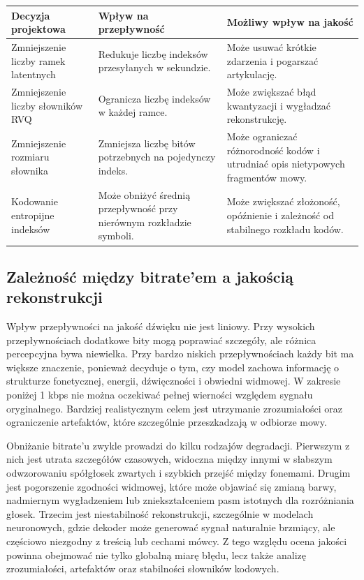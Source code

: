 \begin{center}
\footnotesize
\setlength{\tabcolsep}{4pt}
\begin{tabularx}{0.96\textwidth}{>{\raggedright\arraybackslash}p{} >{\raggedright\arraybackslash}X >{\raggedright\arraybackslash}X}
\toprule
\textbf{Decyzja projektowa} & \textbf{Wpływ na przepływność} & \textbf{Możliwy wpływ na jakość} \\
\midrule
Zmniejszenie liczby ramek latentnych & Redukuje liczbę indeksów przesyłanych w sekundzie. & Może usuwać krótkie zdarzenia i pogarszać artykulację. \\
Zmniejszenie liczby słowników RVQ & Ogranicza liczbę indeksów w każdej ramce. & Może zwiększać błąd kwantyzacji i wygładzać rekonstrukcję. \\
Zmniejszenie rozmiaru słownika & Zmniejsza liczbę bitów potrzebnych na pojedynczy indeks. & Może ograniczać różnorodność kodów i utrudniać opis nietypowych fragmentów mowy. \\
Kodowanie entropijne indeksów & Może obniżyć średnią przepływność przy nierównym rozkładzie symboli. & Może zwiększać złożoność, opóźnienie i zależność od stabilnego rozkładu kodów. \\
\bottomrule
\end{tabularx}
\label{tab:przeplywnosc-decyzje-projektowe}
\end{center}

\subsection{Zależność między bitrate'em a jakością rekonstrukcji}
\label{subsec:bitrate-jakosc-rekonstrukcji}

Wpływ przepływności na jakość dźwięku nie jest liniowy. Przy wysokich przepływnościach dodatkowe bity mogą poprawiać szczegóły, ale różnica percepcyjna bywa niewielka. Przy bardzo niskich przepływnościach każdy bit ma większe znaczenie, ponieważ decyduje o tym, czy model zachowa informację o strukturze fonetycznej, energii, dźwięczności i obwiedni widmowej. W zakresie poniżej 1 kbps nie można oczekiwać pełnej wierności względem sygnału oryginalnego. Bardziej realistycznym celem jest utrzymanie zrozumiałości oraz ograniczenie artefaktów, które szczególnie przeszkadzają w odbiorze mowy.

Obniżanie bitrate'u zwykle prowadzi do kilku rodzajów degradacji. Pierwszym z nich jest utrata szczegółów czasowych, widoczna między innymi w słabszym odwzorowaniu spółgłosek zwartych i szybkich przejść między fonemami. Drugim jest pogorszenie zgodności widmowej, które może objawiać się zmianą barwy, nadmiernym wygładzeniem lub zniekształceniem pasm istotnych dla rozróżniania głosek. Trzecim jest niestabilność rekonstrukcji, szczególnie w modelach neuronowych, gdzie dekoder może generować sygnał naturalnie brzmiący, ale częściowo niezgodny z treścią lub cechami mówcy. Z tego względu ocena jakości powinna obejmować nie tylko globalną miarę błędu, lecz także analizę zrozumiałości, artefaktów oraz stabilności słowników kodowych.

